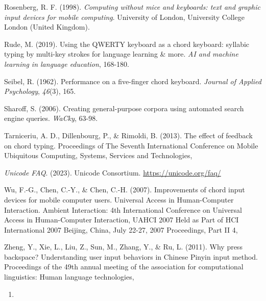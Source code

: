 Rosenberg, R. F. (1998). \emph{Computing without mice and keyboards:
text and graphic input devices for mobile computing}. University of
London, University College London (United Kingdom).

Rude, M. (2019). Using the QWERTY keyboard as a chord keyboard: syllabic
typing by multi-key strokes for language learning \& more. \emph{AI and
machine learning in language education}, 168-180.

Seibel, R. (1962). Performance on a five-finger chord keyboard.
\emph{Journal of Applied Psychology}, \emph{46}(3), 165.

Sharoff, S. (2006). Creating general-purpose corpora using automated
search engine queries. \emph{WaCky}, 63-98.

Tarniceriu, A. D., Dillenbourg, P., \& Rimoldi, B. (2013). The effect of
feedback on chord typing. Proceedings of The Seventh International
Conference on Mobile Ubiquitous Computing, Systems, Services and
Technologies,

\emph{Unicode FAQ}. (2023). Unicode Consortium.
\url{https://unicode.org/faq/}

Wu, F.-G., Chen, C.-Y., \& Chen, C.-H. (2007). Improvements of chord
input devices for mobile computer users. Universal Access in
Human-Computer Interaction. Ambient Interaction: 4th International
Conference on Universal Access in Human-Computer Interaction, UAHCI 2007
Held as Part of HCI International 2007 Beijing, China, July 22-27, 2007
Proceedings, Part II 4,

Zheng, Y., Xie, L., Liu, Z., Sun, M., Zhang, Y., \& Ru, L. (2011). Why
press backspace? Understanding user input behaviors in Chinese Pinyin
input method. Proceedings of the 49th annual meeting of the association
for computational linguistics: Human language technologies,

\begin{enumerate}
\def\labelenumi{\Alph{enumi}.}
\tightlist
\item
\end{enumerate}
